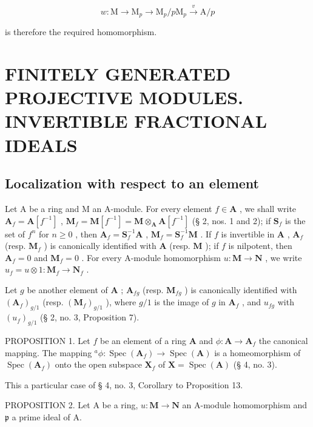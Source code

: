 \[
w: \mathrm{M} \longrightarrow \mathrm{M} _ {p} \longrightarrow \mathrm{M} _ {p} / p \mathrm{M} _ {p} \stackrel {v} {\longrightarrow} \mathrm{A} / p
\]

is therefore the required homomorphism.

\section{FINITELY GENERATED PROJECTIVE MODULES. INVERTIBLE FRACTIONAL IDEALS}

\subsection{Localization with respect to an element}

Let A be a ring and M an A-module. For every element \(f \in \mathbf{A}\) , we shall write \(\mathbf{A}_f = \mathbf{A}[f^{-1}]\) , \(\mathbf{M}_f = \mathbf{M}[f^{-1}] = \mathbf{M} \otimes_{\mathbf{A}} \mathbf{A}[f^{-1}]\) (§ 2, nos. 1 and 2); if \(\mathbf{S}_f\) is the set of \(f^n\) for \(n \geqslant 0\) , then \(\mathbf{A}_f = \mathbf{S}_f^{-1}\mathbf{A}\) , \(\mathbf{M}_f = \mathbf{S}_f^{-1}\mathbf{M}\) . If \(f\) is invertible in \(\mathbf{A}\) , \(\mathbf{A}_f\) (resp. \(\mathbf{M}_f\) ) is canonically identified with \(\mathbf{A}\) (resp. \(\mathbf{M}\) ); if \(f\) is nilpotent, then \(\mathbf{A}_f = 0\) and \(\mathbf{M}_f = 0\) . For every A-module homomorphism \(u: \mathbf{M} \to \mathbf{N}\) , we write \(u_f = u \otimes 1: \mathbf{M}_f \to \mathbf{N}_f\) .

Let \(g\) be another element of \(\mathbf{A}\) ; \(\mathbf{A}_{fg}\) (resp. \(\mathbf{M}_{fg}\) ) is canonically identified with \((\mathbf{A}_f)_{g/1}\) (resp. \((\mathbf{M}_f)_{g/1}\) ), where \(g/1\) is the image of \(g\) in \(\mathbf{A}_f\) , and \(u_{fg}\) with \((u_f)_{g/1}\) (§ 2, no. 3, Proposition 7).

PROPOSITION 1. Let \(f\) be an element of a ring \(\mathbf{A}\) and \(\phi: \mathbf{A} \to \mathbf{A}_f\) the canonical mapping. The mapping \(^a\phi: \operatorname{Spec}(\mathbf{A}_f) \to \operatorname{Spec}(\mathbf{A})\) is a homeomorphism of \(\operatorname{Spec}(\mathbf{A}_f)\) onto the open subspace \(\mathbf{X}_f\) of \(\mathbf{X} = \operatorname{Spec}(\mathbf{A})\) (§ 4, no. 3).

This a particular case of § 4, no. 3, Corollary to Proposition 13.

PROPOSITION 2. Let A be a ring, \(u: \mathbf{M} \to \mathbf{N}\) an A-module homomorphism and \(\mathfrak{p}\) a prime ideal of A.

